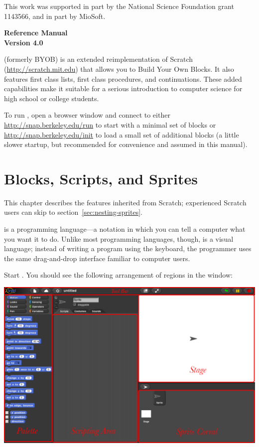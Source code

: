 \documentclass{report}
\begin{document}
This work was supported in part by the National Science Foundation grant 1143566, and in part by MioSoft.

\clearpage

\begin{center}
\bf \Huge \Snap{} Reference Manual \\
\huge Version 4.0
\vspace{40pt}
\end{center}

\Snap{} (formerly BYOB) is an extended reimplementation of Scratch (\url{http://scratch.mit.edu}) that allows you to Build Your Own Blocks. It also features first class lists, first class procedures, and continuations. These added capabilities make it suitable for a serious introduction to computer science for high school or college students.

To run \Snap{}, open a browser window and connect to either \url{http://snap.berkeley.edu/run} to start with a minimal set of blocks or \url{http://snap.berkeley.edu/init} to load a small set of additional blocks (a little slower startup, but recommended for convenience and assumed in this manual).

\clearpage

\chapter{Blocks, Scripts, and Sprites}

This chapter describes the \Snap{} features inherited from Scratch; experienced Scratch users can skip to section~\ref{sec:nesting-sprites}.

\Snap{} is a programming language---a notation in which you can tell a computer what you want it to do. Unlike most programming languages, though, \Snap{} is a visual language; instead of writing a program using the keyboard, the \Snap{} programmer uses the same drag-and-drop interface familiar to computer users.

Start \Snap{}. You should see the following arrangement of regions in the window:\nopagebreak

\begin{center}
\includegraphics[width=\textwidth]{window-regions}
\end{center}
\end{document}
